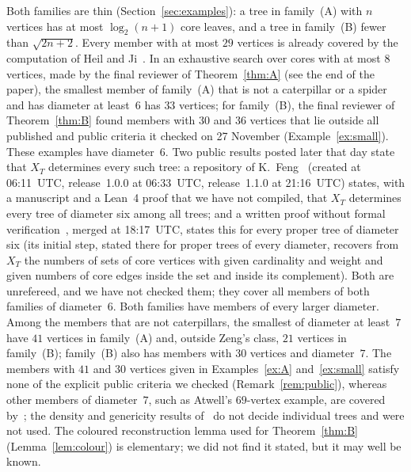 \documentclass[11pt]{article}
\theoremstyle{definition}
\theoremstyle{remark}
\begin{document}
Both families are thin (Section~\ref{sec:examples}): a tree in family~(A) with
$n$ vertices has at most $\log_2(n+1)$ core leaves, and a tree in family~(B)
fewer than $\sqrt{2n+2}$. Every member with at most $29$ vertices is already
covered by the computation of Heil and Ji~\cite{hj}. In an exhaustive search
over cores with at most $8$ vertices, made by the final reviewer of
Theorem~\ref{thm:A} (see the end of the paper), the smallest member of
family~(A) that is not a caterpillar or a spider and has diameter at least~$6$
has $33$ vertices; for family~(B), the final reviewer of Theorem~\ref{thm:B}
found members with $30$ and $36$ vertices that lie outside all published and
public criteria it checked on 27 November (Example~\ref{ex:small}). These
examples have diameter~$6$. Two public results posted later that day state that
$X_T$ determines every such tree: a repository of K.~Feng~\cite{kyf} (created at
06:11~UTC, release~1.0.0 at 06:33~UTC, release~1.1.0 at 21:16~UTC) states, with a
manuscript and a Lean~4 proof that we have not compiled, that $X_T$ determines
every tree of diameter six among all trees; and a written proof without formal
verification~\cite[pull request~1081]{sc}, merged at 18:17~UTC, states this for
every proper tree of diameter six (its initial step, stated there for proper
trees of every diameter, recovers from $X_T$ the numbers of sets of core vertices
with given cardinality and weight and given numbers of core edges inside the set
and inside its complement). Both are unrefereed, and we have not checked them;
they cover all members of both families of diameter~$6$. Both families
have members of every larger diameter. Among the members that are not
caterpillars, the smallest of diameter at least~$7$ have $41$ vertices in
family~(A) and, outside Zeng's class, $21$ vertices in family~(B); family~(B)
also has members with $30$ vertices and diameter~$7$. The members with $41$ and
$30$ vertices given in Examples~\ref{ex:A} and~\ref{ex:small} satisfy none of the
explicit public criteria we checked (Remark~\ref{rem:public}), whereas other
members of diameter~$7$, such as Atwell's $69$-vertex example, are covered
by~\cite{atwell1}; the density and genericity results of~\cite{sc} do not decide
individual trees and were not used. The coloured reconstruction
lemma used for Theorem~\ref{thm:B} (Lemma~\ref{lem:colour}) is elementary; we
did not find it stated, but it may well be known.
\end{document}
